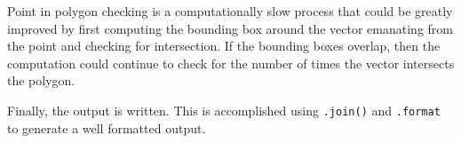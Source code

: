 \documentclass[11pt]{article}
\begin{document}
Point in polygon checking is a computationally slow process that could be greatly improved by first computing the bounding box around the vector emanating from the point and checking for intersection.  If the bounding boxes overlap, then the computation could continue to check for the number of times the vector intersects the polygon. 

Finally, the output is written.  This is accomplished using \texttt{.join()} and \texttt{.format} to generate a well formatted output.
\end{document}
